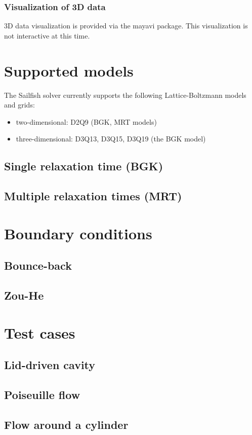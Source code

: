 \documentclass{article}
\begin{document}
\subsubsection{Visualization of 3D data}

3D data visualization is provided via the mayavi package.  This visualization is
not interactive at this time.

\section{Supported models}

The Sailfish solver currently supports the following Lattice-Boltzmann models and grids:
\begin{itemize}
	\item two-dimensional: D2Q9 (BGK, MRT models)
	\item three-dimensional: D3Q13, D3Q15, D3Q19 (the BGK model)
\end{itemize}

\subsection{Single relaxation time (BGK)}

\subsection{Multiple relaxation times (MRT)}

\section{Boundary conditions}

\subsection{Bounce-back}

\subsection{Zou-He}

\section{Test cases}

\subsection{Lid-driven cavity}

\subsection{Poiseuille flow}

\subsection{Flow around a cylinder}
\end{document}
